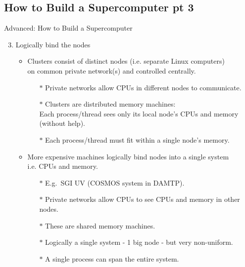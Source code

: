 \subsection{How to Build a Supercomputer pt 3}
\begin{frame}{Advanced: How to Build a Supercomputer}
\begin{enumerate}
\setcounter{enumi}{2}
\item{Logically bind the nodes}
\begin{itemize}
\item{Clusters consist of distinct nodes (i.e. separate Linux computers)\hfill\\
on common private network(s) and controlled centrally.}
\begin{itemize}
\item[$\ast$]{Private networks allow CPUs in different nodes to communicate.}
\pause
\item[$\ast$]{Clusters are \alert{distributed memory} machines:\hfill\\
\alert{Each process/thread sees only its local node's CPUs and memory (without help).}}
\pause
\item[$\ast$]{\color{red}Each process/thread must fit within a single node's memory.}
\end{itemize}
\pause
\item{More expensive machines logically bind nodes into a single system\hfill\\
{}\qquad i.e. CPUs \alert{and} memory.}
\begin{itemize}
\item[$\ast$]{E.g.\ SGI UV (\alert{COSMOS} system in DAMTP).}
\item[$\ast$]{Private networks allow CPUs to see CPUs and memory in other nodes.}
\pause
\item[$\ast$]{These are \alert{shared memory} machines.}
\item[$\ast$]{Logically a single system - 1 big node - but very non-uniform.}
\item[$\ast$]{A single process can span the entire system.}
\end{itemize}
\end{itemize}
\end{enumerate}
\end{frame}

